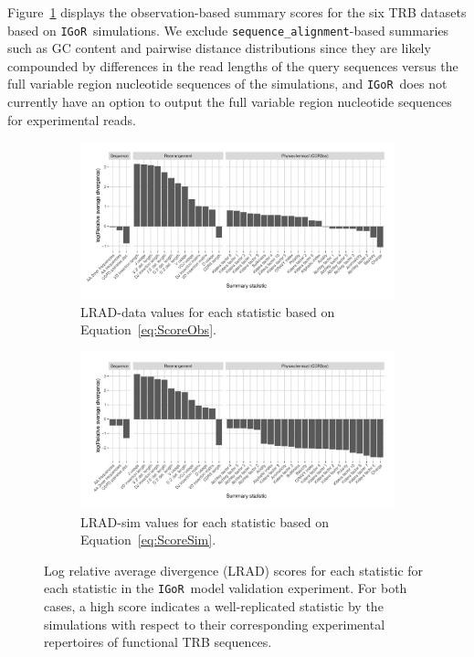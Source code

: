 \documentclass{article}
\newcommand{\igor}{\texttt{IGoR}}
\begin{document}
Figure~\ref{fig:ObsScoresTCR} displays the observation-based summary scores for the six TRB datasets based on \igor\ simulations.
We exclude \texttt{sequence\_alignment}-based summaries such as GC content and pairwise distance distributions since they are likely compounded by differences in the read lengths of the query sequences versus the full variable region nucleotide sequences of the simulations, and \igor\ does not currently have an option to output the full variable region nucleotide sequences for experimental reads.
\begin{figure}
	\begin{subfigure}{\textwidth}
    	\includegraphics[width=\linewidth]{Figures/IgorScores/obs_score_plot.pdf}
    	\caption{LRAD-data values for each statistic based on Equation~\ref{eq:ScoreObs}.
        }
    	\label{fig:ObsScoresTCR}
	\end{subfigure}
	\begin{subfigure}{\textwidth}
    	\includegraphics[width=\linewidth]{Figures/IgorScores/sim_score_plot.pdf}
    	\caption{LRAD-sim values for each statistic based on Equation~\ref{eq:ScoreSim}.
    	}
    	\label{fig:SimScoresTCR}
	\end{subfigure}
	\caption{Log relative average divergence (LRAD) scores for each statistic for each statistic in the \igor\ model validation experiment. For both cases, a high score indicates a well-replicated statistic by the simulations with respect to their corresponding experimental repertoires of functional TRB sequences.}
\end{figure}
\end{document}

